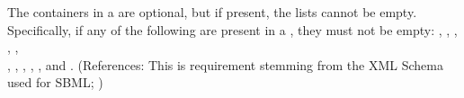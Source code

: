 The  containers in a \Model are optional, but
if present, the lists cannot be empty.  Specifically, if any of
the following are present in a \Model, they must not be empty:
, ,
, ,
, \\
,
, ,
, ,
 and .  (References:
This is requirement stemming from the XML Schema used for SBML;
)
